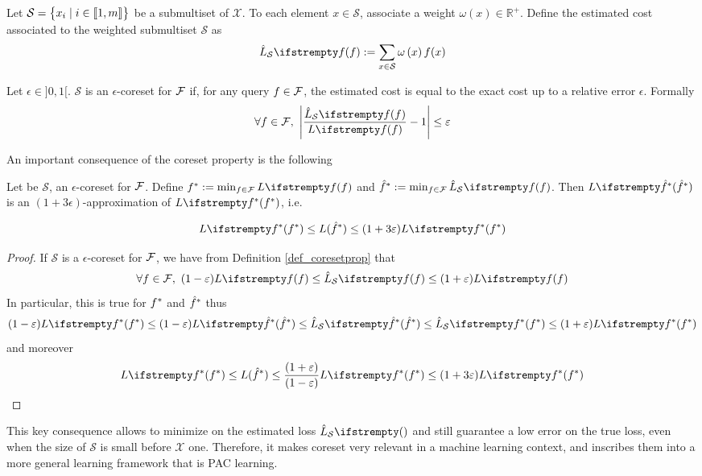 Let $\mathcal{S}=\begin{Bmatrix}
x_{i} \mid i\in \llbracket 1,m \rrbracket
\end{Bmatrix}$ be a submultiset of $\mathcal{X}$. To each element $x \in \mathcal{S}$, associate a weight $\omega\left(x\right) \in \mathbb{R}^{+}$. Define the estimated cost associated to the weighted submultiset $\mathcal{S}$ as
$$
\estloss{\mathcal{S}}{\query}:=\sum_{x \in \mathcal{S}} \omega\left(x\right) \query(x)
$$
\begin{definition}[Coreset]
    \label{def_coresetprop}
    Let $\epsilon \in {]}0,1{[}$. $\mathcal{S}$ is an $\epsilon$-coreset for $\mathcal{F}$ if, for any query $f \in \mathcal{F}$, the estimated cost is equal to the exact cost up to a relative error $\epsilon$. Formally
    \begin{equation}
        \forall  \query \in \queryset,\ \left|\frac{\estloss{\mathcal{S}}{\query}}{\loss{\query}}-1\right| \le \epsilon 
    \end{equation}
\end{definition}
An important consequence of the coreset property is the following

\begin{theorem}
    Let be $\mathcal{S}$, an $\epsilon$-coreset for $\mathcal{F}$. Define $\query^*:=\min_{\query \in \queryset}\loss{\query}$ and $\hat \query^*:=\min_{\query \in \queryset}\estloss{\mathcal{S}}{\query}$. Then $\loss{\hat\query^*} $ is an $(1+3\epsilon)$-approximation of $\loss{\query^*}$, i.e.

    \begin{equation*}
        \loss{\query^*} \le {L}( \hat\query^*)\leq (1+ 3 \epsilon)\loss{\query^*}
    \end{equation*}
    \label{thm_optcoreset}
\end{theorem}
\begin{proof}
    If $\mathcal{S}$ is a $\epsilon$-coreset for $\mathcal{F}$, we have from Definition \ref{def_coresetprop} that 
    \begin{equation*}
        \forall \query \in \queryset ,\ (1-\epsilon) \loss{\query} \le \estloss{\mathcal{S}}{\query} \le(1+\epsilon) \loss{\query}
    \end{equation*}
    In particular, this is true for $f^*$ and $\hat {f}^*$ thus
    \begin{equation}
        (1-\epsilon) \loss{\query^*} \le(1-\epsilon) \loss{\hat\query^*} \le \estloss{\mathcal{S}}{\hat\query^*} \le \estloss{\mathcal{S}}{\query^*} \le(1+\epsilon) \loss{\query^*}
    \end{equation}
    and moreover
    \begin{equation*}
        \loss{\query^*} \le {L}( \hat\query^*) \le \frac{(1+\epsilon)}{(1-\epsilon) } \loss{\query^*} \leq (1+ 3 \epsilon)\loss{\query^*}
        \end{equation*}
\end{proof}
This key consequence allows to minimize on the estimated loss $\estloss{\mathcal{S}}{}$ and still guarantee a low error on the true loss, even when the size of $\mathcal{S}$ is small before $\mathcal{X}$ one. Therefore, it makes coreset very relevant in a machine learning context, and  inscribes them into a more general learning framework that is PAC learning.

